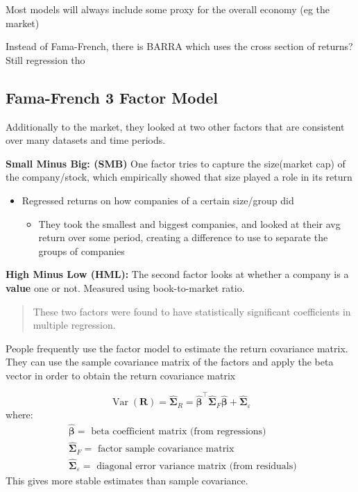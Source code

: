 \documentclass[
  oneside]{book}
\providecommand{\tightlist}{%
  \setlength{\itemsep}{0pt}\setlength{\parskip}{0pt}}
\begin{document}
Most models will always include some proxy for the overall economy (eg the market)

Instead of Fama-French, there is BARRA which uses the cross section of returns? Still regression tho

\hypertarget{fama-french-3-factor-model}{%
\subsection{Fama-French 3 Factor Model}\label{fama-french-3-factor-model}}

Additionally to the market, they looked at two other factors that are consistent over many datasets and time periods.

\textbf{Small Minus Big: (SMB)}
One factor tries to capture the size(market cap) of the company/stock, which empirically showed that size played a role in its return

\begin{itemize}
\tightlist
\item
  Regressed returns on how companies of a certain size/group did

  \begin{itemize}
  \tightlist
  \item
    They took the smallest and biggest companies, and looked at their avg return over some period, creating a difference to use to separate the groups of companies
  \end{itemize}
\end{itemize}

\textbf{High Minus Low (HML):}
The second factor looks at whether a company is a \textbf{value} one or not. Measured using book-to-market ratio.

\begin{quote}
These two factors were found to have statistically significant coefficients in multiple regression.
\end{quote}

People frequently use the factor model to estimate the return covariance matrix.
They can use the sample covariance matrix of the factors and apply the beta vector in order to obtain the return covariance matrix

\[
\operatorname{Var}(\mathbf{R})=\hat{\boldsymbol{\Sigma}}_R=\hat{\boldsymbol{\beta}}^{\top} \hat{\boldsymbol{\Sigma}}_F \hat{\boldsymbol{\beta}}+\hat{\boldsymbol{\Sigma}}_{\varepsilon}
\]
where:
\[
\begin{aligned}
& \hat{\boldsymbol{\beta}}=\text { beta coefficient matrix (from regressions) } \\
& \hat{\boldsymbol{\Sigma}}_F=\text { factor sample covariance matrix } \\
& \hat{\boldsymbol{\Sigma}}_{\varepsilon}=\text { diagonal error variance matrix (from residuals) }
\end{aligned}
\]
This gives more stable estimates than sample covariance.
\end{document}
